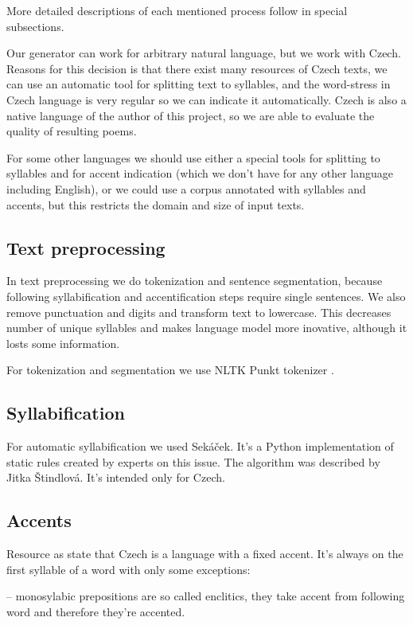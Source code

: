 \documentclass[a4]{article}
\begin{document}
More detailed descriptions of each mentioned process follow in special subsections.

Our generator can work for arbitrary natural language, but we work with
Czech. Reasons for this decision is that there exist many
resources of Czech texts, we can use an automatic tool for splitting text to syllables,
and the word-stress in Czech language is very regular so we can indicate
it automatically. Czech is also a native language of the author of this
project, so we are able to evaluate the quality of resulting poems. 

For some other languages we should use either a special tools for splitting
to syllables and for accent indication (which we don't have for any other
language including English),
or we could use a corpus annotated with syllables and accents, but this
restricts the domain and size of input texts.


\subsection{Text preprocessing}

In text preprocessing we do tokenization and sentence segmentation, because
following syllabification and accentification steps require single sentences. We also
remove punctuation and digits and transform text to lowercase. This decreases number of
unique syllables and makes language model more inovative, although it losts
some information.

For tokenization and segmentation we use NLTK Punkt tokenizer \cite{nltk}. %

\subsection{Syllabification}

For automatic syllabification we used Sekáček\cite{sekacek}.
It's a Python implementation of static rules created by experts on this
issue. The algorithm was described by Jitka Štindlová\cite{naserec}.
It's intended only for Czech.

\subsection{Accents}

Resource as\cite{prizvuk} state that Czech is a language with
a fixed accent. It's always on the first syllable of a word with only some exceptions: 

-- monosylabic prepositions are so called enclitics, they take accent from
following word and therefore they're accented. 
\end{document}
